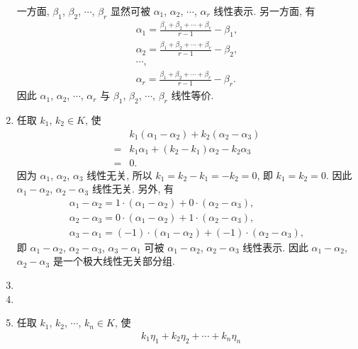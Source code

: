 \documentclass[a4paper, 11pt]{ctexart}
\begin{document}
\begin{enumerate}
            一方面, $\beta_1$, $\beta_2$, $\cdots$, $\beta_r$ 显然可被 $\alpha_1$, $\alpha_2$, $\cdots$, $\alpha_r$ 线性表示. 另一方面, 有
            \begin{gather*}
                \alpha_1 = \frac{\beta_1 + \beta_2 + \cdots + \beta_r}{r - 1} - \beta_1, \\
                \alpha_2 = \frac{\beta_1 + \beta_2 + \cdots + \beta_r}{r - 1} - \beta_2, \\
                \cdots, \\
                \alpha_r = \frac{\beta_1 + \beta_2 + \cdots + \beta_r}{r - 1} - \beta_r.    
            \end{gather*}
            因此 $\alpha_1$, $\alpha_2$, $\cdots$, $\alpha_r$ 与 $\beta_1$, $\beta_2$, $\cdots$, $\beta_r$ 线性等价.
        \item %
            任取 $k_1$, $k_2 \in K$, 使
            \begin{align*}
                    & k_1(\alpha_1 - \alpha_2) + k_2(\alpha_2 - \alpha_3) \\
                ={} & k_1\alpha_1 + (k_2 - k_1)\alpha_2 - k_2\alpha_3 \\
                ={} & 0.
            \end{align*}
            因为 $\alpha_1$, $\alpha_2$, $\alpha_3$ 线性无关, 所以 $k_1 = k_2 - k_1 = -k_2 = 0$, 即 $k_1 = k_2 = 0$.
            因此 $\alpha_1 - \alpha_2$, $\alpha_2 - \alpha_3$ 线性无关. 另外, 有
            \begin{gather*}
                \alpha_1 - \alpha_2 = 1 \cdot (\alpha_1 - \alpha_2) + 0 \cdot (\alpha_2 - \alpha_3), \\
                \alpha_2 - \alpha_3 = 0 \cdot (\alpha_1 - \alpha_2) + 1 \cdot (\alpha_2 - \alpha_3), \\
                \alpha_3 - \alpha_1 = (-1) \cdot (\alpha_1 - \alpha_2) + (-1) \cdot (\alpha_2 - \alpha_3),
            \end{gather*}
            即 $\alpha_1 - \alpha_2$, $\alpha_2 - \alpha_3$, $\alpha_3 - \alpha_1$ 可被 $\alpha_1 - \alpha_2$, $\alpha_2 - \alpha_3$ 线性表示.
            因此 $\alpha_1 - \alpha_2$, $\alpha_2 - \alpha_3$ 是一个极大线性无关部分组.
        \item %
        \item %
        \item %
            任取 $k_1$, $k_2$, $\cdots$, $k_n \in K$, 使
            \begin{align*}
                & k_1\eta_1 + k_2\eta_2 + \cdots + k_n\eta_n \\

\end{align*}
\end{enumerate}
\end{document}
